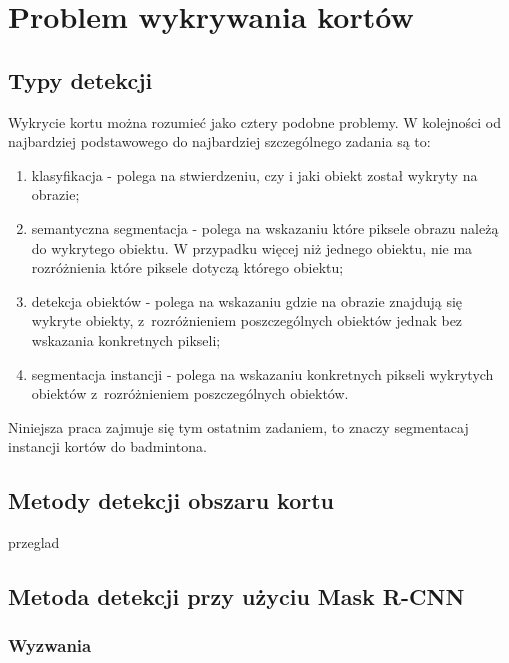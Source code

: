 \chapter{Problem wykrywania kortów}

\section{Typy detekcji}
\label{sec:typy_detekcji}

Wykrycie kortu można rozumieć jako cztery podobne problemy.
W kolejności od najbardziej podstawowego do najbardziej szczególnego zadania są to:

\begin{enumerate}
	\item klasyfikacja - polega na stwierdzeniu, czy i jaki obiekt został wykryty na obrazie;
  \item semantyczna segmentacja - polega na wskazaniu które piksele obrazu należą do wykrytego obiektu.
        W przypadku więcej niż jednego obiektu, nie ma rozróżnienia które piksele dotyczą którego obiektu;
	\item detekcja obiektów - polega na wskazaniu gdzie na obrazie znajdują się wykryte obiekty, z~rozróżnieniem poszczególnych obiektów jednak bez wskazania konkretnych pikseli;
	\item segmentacja instancji - polega na wskazaniu konkretnych pikseli wykrytych obiektów z~rozróżnieniem poszczególnych obiektów.
\end{enumerate}

Niniejsza praca zajmuje się tym ostatnim zadaniem, to znaczy segmentacaj instancji kortów do badmintona.

\section{Metody detekcji obszaru kortu}


{przeglad}

\section{Metoda detekcji przy użyciu Mask R-CNN}

\subsection{Wyzwania}

